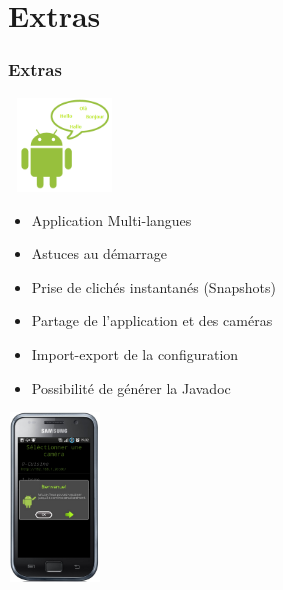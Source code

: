\section{Extras}
\begin{frame}
\frametitle{Extras}
\includegraphics[width=3cm, height=2.5cm]{Images/ImageSlide11-3.png}\\
\begin{minipage}{0.69\textwidth}
\begin{itemize}
  \item Application Multi-langues
  \item Astuces au démarrage
  \item Prise de clichés instantanés (Snapshots)
  \item Partage de l'application et des caméras
  \item Import-export de la configuration
  \item Possibilité de générer la Javadoc 
\end{itemize}
\end{minipage}
\begin{minipage}{0.29\textwidth}
\includegraphics[width=2.5cm, height=4.5cm]{Images/ImageSlide11-3a.png}
\end{minipage}
\end{frame}